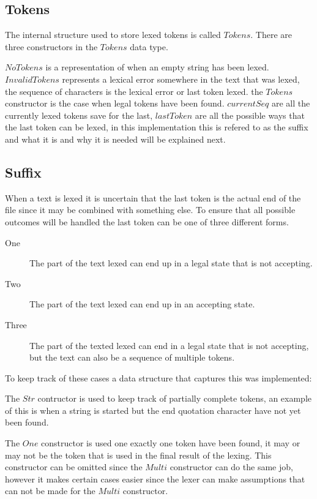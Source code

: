 \subsection{Tokens}
The internal structure used to store lexed tokens is called $Tokens$. There are
three constructors in the $Tokens$ data type.

$NoTokens$ is a representation of when an empty string has been lexed.
$InvalidTokens$ represents a lexical error somewhere in the text that was lexed,
the sequence of characters is the lexical error or last token lexed. the
$Tokens$ constructor is the case when legal tokens have been found. $currentSeq$
are all the currently lexed tokens save for the last, $lastToken$ are all the
possible ways that the last token can be lexed, in this implementation this is
refered to as the suffix and what it is and why it is needed will be explained
next.

\subsection{Suffix}
When a text is lexed it is uncertain that the last token is the actual end of
the file since it may be combined with something else. To ensure that all
possible outcomes will be handled the last token can be one of three different
forms.

\begin{description}
\item[One] The part of the text lexed can end up in a legal state that is not
accepting.
\item[Two] The part of the text lexed can end up in an accepting state.
\item[Three] The part of the texted lexed can end in a legal state that is not
accepting, but the text can also be a sequence of multiple tokens.
\end{description}
To keep track of these cases a data structure that captures this was
implemented:

The $Str$ contructor is used to keep track of partially complete tokens, an
example of this is when a string is started but the end quotation character have
not yet been found.

The $One$ constructor is used one exactly one token have been found, it may or
may not be the token that is used in the final result of the lexing. This
constructor can be omitted since the $Multi$ constructor can do the same job,
however it makes certain cases easier since the lexer can make assumptions that
can not be made for the $Multi$ constructor.

